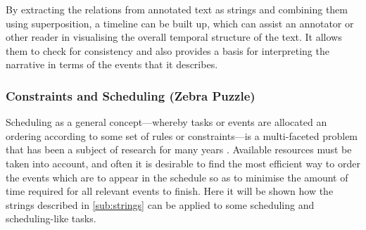 \documentclass[a4paper,12pt,leqno,twoside]{article}
\begin{document}
By extracting the relations from annotated text as strings and combining them using superposition, a timeline can be built up, which can assist an annotator or other reader in visualising the overall temporal structure of the text. It allows them to check for consistency and also provides a basis for interpreting the narrative in terms of the events that it describes.



\subsubsection{Constraints and Scheduling (Zebra Puzzle)}\label{ssub:zebra}
Scheduling as a general concept---whereby tasks or events are allocated an ordering according to some set of rules or constraints---is a multi-faceted problem that has been a subject of research for many years \citep{manne1960job,applegate1991computational,pinedo1992scheduling,gong2018memetic}. Available resources must be taken into account, and often it is desirable to find the most efficient way to order the events which are to appear in the schedule so as to minimise the amount of time required for all relevant events to finish. Here it will be shown how the strings described in \cref{sub:strings} can be applied to some scheduling and scheduling-like tasks.
\end{document}
